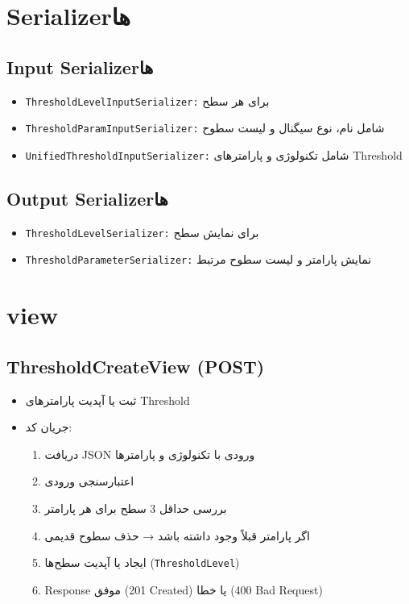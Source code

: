 \documentclass{report}
\begin{document}
\section{Serializerها}

\subsection{Input Serializerها}
\begin{itemize}
    \item \texttt{ThresholdLevelInputSerializer:} برای هر سطح
    \item \texttt{ThresholdParamInputSerializer:} شامل نام، نوع سیگنال و لیست سطوح
    \item \texttt{UnifiedThresholdInputSerializer:} شامل تکنولوژی و پارامترهای Threshold
\end{itemize}

\subsection{Output Serializerها}
\begin{itemize}
    \item \texttt{ThresholdLevelSerializer:} برای نمایش سطح
    \item \texttt{ThresholdParameterSerializer:} نمایش پارامتر و لیست سطوح مرتبط
\end{itemize}

\section{view}

\subsection{ThresholdCreateView (POST)}
\begin{itemize}
    \item ثبت یا آپدیت پارامترهای Threshold
    \item جریان کد:
    \begin{enumerate}
        \item دریافت JSON ورودی با تکنولوژی و پارامترها
        \item اعتبارسنجی ورودی
        \item بررسی حداقل 3 سطح برای هر پارامتر
        \item اگر پارامتر قبلاً وجود داشته باشد → حذف سطوح قدیمی
        \item ایجاد یا آپدیت سطح‌ها (\texttt{ThresholdLevel})
        \item Response موفق (201 Created) یا خطا (400 Bad Request)
    \end{enumerate}
\end{itemize}
\end{document}
